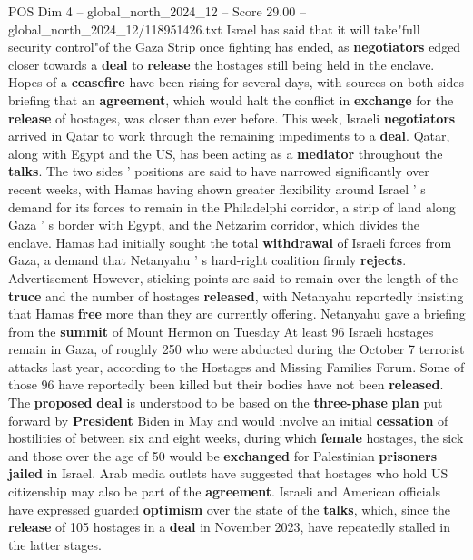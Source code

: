 \begin{textsample}{POS Dim 4 – global\_north\_2024\_12 – Score 29.00 – global\_north\_2024\_12/118951426.txt}  \label{ex:f4_pos_323}
Israel has said that it will take"full security control"of the Gaza Strip once fighting has ended, as \textbf{negotiators} edged closer towards a \textbf{deal} to \textbf{release} the hostages still being held in the enclave.
Hopes of a \textbf{ceasefire} have been rising for several days, with sources on both sides briefing that an \textbf{agreement}, which would halt the conflict in \textbf{exchange} for the \textbf{release} of hostages, was closer than ever before.
This week, Israeli \textbf{negotiators} arrived in Qatar to work through the remaining impediments to a \textbf{deal}.
Qatar, along with Egypt and the US, has been acting as a \textbf{mediator} throughout the \textbf{talks}.
The two sides ' positions are said to have narrowed significantly over recent weeks, with Hamas having shown greater flexibility around Israel ' s demand for its forces to remain in the Philadelphi corridor, a strip of land along Gaza ' s border with Egypt, and the Netzarim corridor, which divides the enclave.
Hamas had initially sought the total \textbf{withdrawal} of Israeli forces from Gaza, a demand that Netanyahu ' s hard-right coalition firmly \textbf{rejects}.
Advertisement However, sticking points are said to remain over the length of the \textbf{truce} and the number of hostages \textbf{released}, with Netanyahu reportedly insisting that Hamas \textbf{free} more than they are currently offering.
Netanyahu gave a briefing from the \textbf{summit} of Mount Hermon on Tuesday At least 96 Israeli hostages remain in Gaza, of roughly 250 who were abducted during the October 7 terrorist attacks last year, according to the Hostages and Missing Families Forum.
Some of those 96 have reportedly been killed but their bodies have not been \textbf{released}.
The \textbf{proposed} \textbf{deal} is understood to be based on the \textbf{three-phase} \textbf{plan} put forward by \textbf{President} Biden in May and would involve an initial \textbf{cessation} of hostilities of between six and eight weeks, during which \textbf{female} hostages, the sick and those over the age of 50 would be \textbf{exchanged} for Palestinian \textbf{prisoners} \textbf{jailed} in Israel.
Arab media outlets have suggested that hostages who hold US citizenship may also be part of the \textbf{agreement}.
Israeli and American officials have expressed guarded \textbf{optimism} over the state of the \textbf{talks}, which, since the \textbf{release} of 105 hostages in a \textbf{deal} in November 2023, have repeatedly stalled in the latter stages.

\end{textsample}

